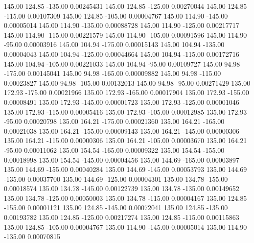     145.00    124.85   -135.00     0.00245431
    145.00    124.85   -125.00     0.00270044
    145.00    124.85   -115.00     0.00107309
    145.00    124.85   -105.00     0.00004767
    145.00    114.90   -145.00     0.00005014
    145.00    114.90   -135.00     0.00088728
    145.00    114.90   -125.00     0.00217717
    145.00    114.90   -115.00     0.00221579
    145.00    114.90   -105.00     0.00091596
    145.00    114.90    -95.00     0.00003916
    145.00    104.94   -175.00     0.00015143
    145.00    104.94   -135.00     0.00004043
    145.00    104.94   -125.00     0.00044664
    145.00    104.94   -115.00     0.00172716
    145.00    104.94   -105.00     0.00221033
    145.00    104.94    -95.00     0.00109727
    145.00     94.98   -175.00     0.00145041
    145.00     94.98   -165.00     0.00009882
    145.00     94.98   -115.00     0.00023827
    145.00     94.98   -105.00     0.00132013
    145.00     94.98    -95.00     0.00271429
    135.00    172.93   -175.00     0.00021966
    135.00    172.93   -165.00     0.00017904
    135.00    172.93   -155.00     0.00008491
    135.00    172.93   -145.00     0.00001723
    135.00    172.93   -125.00     0.00001046
    135.00    172.93   -115.00     0.00005416
    135.00    172.93   -105.00     0.00012985
    135.00    172.93    -95.00     0.00020798
    135.00    164.21   -175.00     0.00021360
    135.00    164.21   -165.00     0.00021038
    135.00    164.21   -155.00     0.00009143
    135.00    164.21   -145.00     0.00000306
    135.00    164.21   -115.00     0.00000306
    135.00    164.21   -105.00     0.00003670
    135.00    164.21    -95.00     0.00011062
    135.00    154.54   -165.00     0.00009322
    135.00    154.54   -155.00     0.00018998
    135.00    154.54   -145.00     0.00004456
    135.00    144.69   -165.00     0.00003897
    135.00    144.69   -155.00     0.00040284
    135.00    144.69   -145.00     0.00053793
    135.00    144.69   -135.00     0.00037700
    135.00    144.69   -125.00     0.00004301
    135.00    134.78   -155.00     0.00018574
    135.00    134.78   -145.00     0.00122739
    135.00    134.78   -135.00     0.00149652
    135.00    134.78   -125.00     0.00050003
    135.00    134.78   -115.00     0.00004167
    135.00    124.85   -155.00     0.00001121
    135.00    124.85   -145.00     0.00072041
    135.00    124.85   -135.00     0.00193782
    135.00    124.85   -125.00     0.00217274
    135.00    124.85   -115.00     0.00115863
    135.00    124.85   -105.00     0.00004767
    135.00    114.90   -145.00     0.00005014
    135.00    114.90   -135.00     0.00070815
